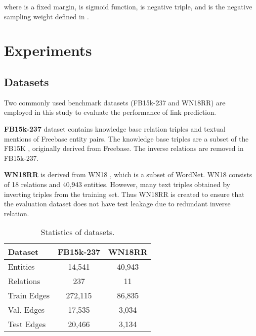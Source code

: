 \documentclass[11pt,a4paper]{article}
\begin{document}
where  is a fixed margin,  is sigmoid function,  is negative 
triple, and  is the negative sampling weight defined in \cite{Sun2019RotatEKG}.














\section{Experiments}\label{sec:exp}

\subsection{Datasets}
Two commonly used benchmark datasets (FB15k-237 and WN18RR) are employed in this study to evaluate the performance of link prediction.

\noindent\textbf{FB15k-237} \cite{toutanova2015observed} dataset contains knowledge base relation triples and textual mentions of Freebase entity pairs. The knowledge base triples are a subset of the FB15K \cite{bordes2013translating}, originally derived from Freebase. The inverse relations are removed in FB15k-237.

\noindent\textbf{WN18RR} \cite{dettmers2017conve} is derived from WN18 \cite{bordes2013translating}, which is a subset of WordNet. WN18 consists of 18 relations and 40,943 entities. However, many text triples obtained by inverting triples from the training set. Thus WN18RR \cite{dettmers2017conve} is created to ensure that the evaluation dataset does not have test leakage due to redundant inverse relation. 

\begin{table}[!h]
	\begin{center}
		\setlength{\tabcolsep}{2pt}
		\begin{tabular}{|l|c|c|}
\hline
			Dataset & FB15k-237 & WN18RR \\
			\hline
Entities	 & 14,541	& 40,943   \\
			Relations	 & 237 & 11  \\
			Train Edges	 & 272,115 & 86,835  \\
			Val. Edges	 & 17,535 & 3,034  \\
			Test Edges	 & 20,466 & 3,134  \\
\hline
\end{tabular}
		\vspace{-5pt}
		\caption{Statistics of datasets.}\label{tbl:sample}
	\end{center}
\end{table}
\end{document}
